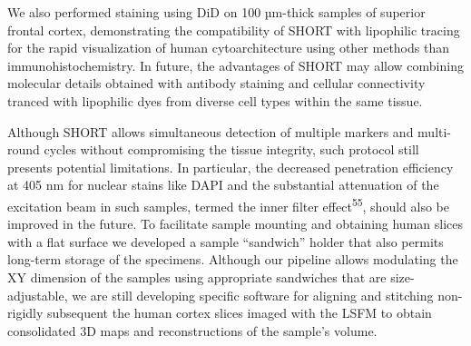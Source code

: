 \documentclass{article}
\begin{document}

We also performed staining using DiD on 100 µm-thick samples of superior frontal cortex, demonstrating the compatibility of SHORT with lipophilic tracing for the rapid visualization of human cytoarchitecture using other methods than immunohistochemistry. In future, the advantages of SHORT may allow combining molecular details obtained with antibody staining and cellular connectivity tranced with lipophilic dyes from diverse cell types within the same tissue.

Although SHORT allows simultaneous detection of multiple markers and multi-round cycles without compromising the tissue integrity, such protocol still presents potential limitations. In particular, the decreased penetration efficiency at 405 nm for nuclear stains like DAPI and the substantial attenuation of the excitation beam in such samples, termed the inner filter effect\textsuperscript{55}, should also be improved in the future. To facilitate sample mounting and obtaining human slices with a flat surface we developed a sample “sandwich” holder that also permits long-term storage of the specimens. Although our pipeline allows modulating the XY dimension of the samples using appropriate sandwiches that are size-adjustable, we are still developing specific software for aligning and stitching non-rigidly subsequent the human cortex slices imaged with the LSFM to obtain consolidated 3D maps and reconstructions of the sample’s volume.
\end{document}
